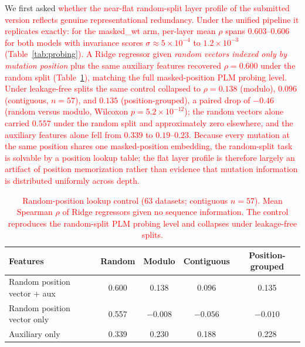 \documentclass[numbered,webpdf,modern,large]{oup-authoring-template}
\newcommand{\rev}[1]{\textcolor{red}{#1}}
\begin{document}
We first asked \rev{whether the near-flat random-split layer profile of the submitted
version reflects genuine representational redundancy. Under the unified pipeline it
replicates exactly: for the masked\_wt arm, per-layer mean $\rho$ spans
$0.603$--$0.606$ for both models with invariance scores $\sigma \approx 5 \times
10^{-4}$ to $1.2 \times 10^{-3}$ (Table~\ref{tab:probing}). A Ridge regressor given
\emph{random vectors indexed only by mutation position} plus the same auxiliary
features recovered $\rho = 0.600$ under the random split (Table~\ref{tab:control}),
matching the full masked-position PLM probing level. Under leakage-free splits the
same control collapsed to $\rho = 0.138$ (modulo), $0.096$ (contiguous, $n=57$), and
$0.135$ (position-grouped), a paired drop of $-0.46$ (random versus modulo, Wilcoxon
$p = 5.2 \times 10^{-12}$); the random vectors alone carried $0.557$ under the random
split and approximately zero elsewhere, and the auxiliary features alone fell from
$0.339$ to $0.19$--$0.23$. Because every mutation at the same position shares one
masked-position embedding, the random-split task is solvable by a position lookup
table; the flat layer profile is therefore largely an artifact of position
memorization rather than evidence that mutation information is distributed uniformly
across depth.}

\begin{table}[ht]
\centering
\caption{\rev{Random-position lookup control (63 datasets; contiguous $n = 57$).
Mean Spearman $\rho$ of Ridge regressors given no sequence information. The control
reproduces the random-split PLM probing level and collapses under leakage-free
splits.}}
\label{tab:control}
\begin{tabular}{lcccc}
\toprule
Features & Random & Modulo & Contiguous & Position-grouped \\
\midrule
Random position vector + aux & 0.600 & 0.138 & 0.096 & 0.135 \\
Random position vector only  & 0.557 & $-0.008$ & $-0.056$ & $-0.010$ \\
Auxiliary only               & 0.339 & 0.230 & 0.188 & 0.228 \\
\bottomrule
\end{tabular}
\end{table}
\end{document}
